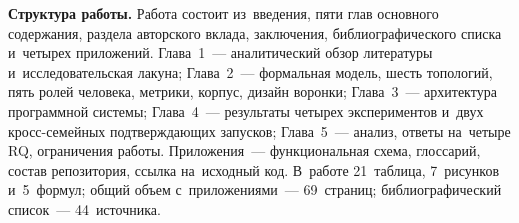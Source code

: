 \textbf{Структура работы.} Работа состоит из~введения, пяти глав
основного содержания, раздела авторского вклада, заключения,
библиографического списка и~четырех приложений. Глава~1~--- аналитический
обзор литературы и~исследовательская лакуна; Глава~2~--- формальная
модель, шесть топологий, пять ролей человека, метрики, корпус, дизайн
воронки; Глава~3~--- архитектура программной системы; Глава~4~---
результаты четырех экспериментов и~двух кросс-семейных подтверждающих
запусков; Глава~5~--- анализ, ответы на~четыре RQ, ограничения работы.
Приложения~--- функциональная схема, глоссарий, состав репозитория,
ссылка на~исходный код. В~работе 21~таблица, 7~рисунков и~5~формул;
общий объем с~приложениями~--- 69~страниц; библиографический
список~--- 44~источника.

